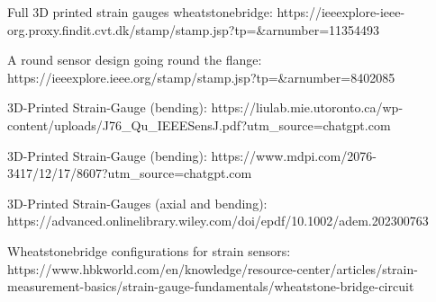Full 3D printed strain gauges wheatstonebridge:
https://ieeexplore-ieee-org.proxy.findit.cvt.dk/stamp/stamp.jsp?tp=&arnumber=11354493

A round sensor design going round the flange:
https://ieeexplore.ieee.org/stamp/stamp.jsp?tp=&arnumber=8402085

3D-Printed Strain-Gauge (bending):
https://liulab.mie.utoronto.ca/wp-content/uploads/J76_Qu_IEEESensJ.pdf?utm_source=chatgpt.com

3D-Printed Strain-Gauge (bending):
https://www.mdpi.com/2076-3417/12/17/8607?utm_source=chatgpt.com

3D-Printed Strain-Gauges (axial and bending):
https://advanced.onlinelibrary.wiley.com/doi/epdf/10.1002/adem.202300763

Wheatstonebridge configurations for strain sensors:
https://www.hbkworld.com/en/knowledge/resource-center/articles/strain-measurement-basics/strain-gauge-fundamentals/wheatstone-bridge-circuit